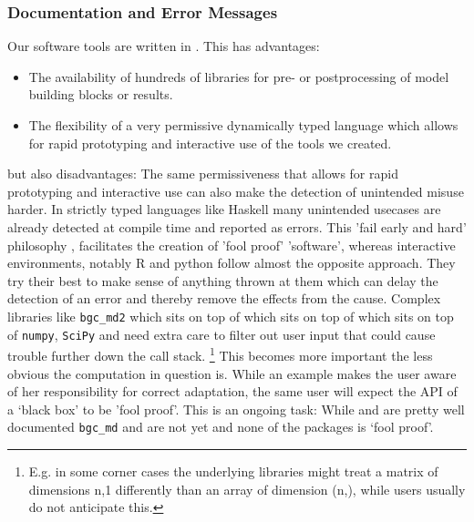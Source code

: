 \subsubsection{Documentation and Error Messages}
Our software tools are written in \python{}. 
This has advantages:
\begin{itemize}
  \item
  The availability of hundreds of libraries for pre-  or postprocessing of model building blocks or results.
  \item
  The flexibility of a very permissive dynamically typed language which allows for rapid prototyping and interactive use of the tools we created.
\end{itemize}
but also disadvantages: The same permissiveness that allows for rapid prototyping and interactive use can also make the detection of unintended misuse harder.
In strictly typed languages like Haskell many unintended usecases are already detected at compile time and reported as errors.
This 'fail early and hard' philosophy , facilitates the creation of 'fool proof'
'software', whereas interactive environments, notably  R and python follow
almost the opposite approach.  They try their best to make sense of anything
thrown at them which can delay the detection of an error and thereby remove the effects from the cause.
Complex libraries like \texttt{bgc\_md2} which sits on top of \CompartmentalSystems{} which sits on top of \LAPM{} which sits on top of \texttt{numpy}, \texttt{SciPy} and \sympy{}
need extra care to filter out user input that could cause trouble further down the call stack. 
\footnote{E.g. in some corner cases the underlying libraries might treat a matrix of dimensions n,1 differently than an array of dimension (n,), while users usually do not anticipate this.} This becomes more important the less obvious the computation in question is. 
While an example makes the user aware of her responsibility for correct adaptation, the same user will expect the API of a `black box' to be 'fool proof'. 
This is an ongoing task: While \LAPM{} and \CompartmentalSystems{} are pretty well documented 
\texttt{bgc\_md} and \ComputabilityGraphs{} are not yet and none of the packages is `fool proof'. 




